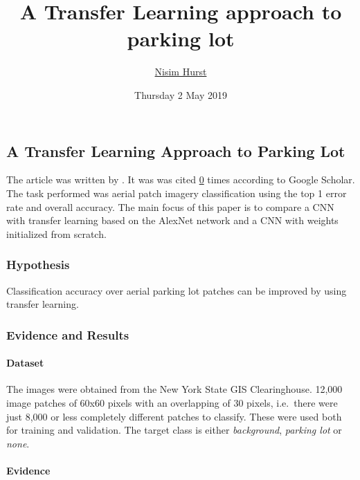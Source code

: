 \documentclass[]{article}
\title{A Transfer Learning approach to parking lot}
\author{\href{mailto:langheran@gmail.com}{Nisim Hurst}}
\date{Thursday 2 May 2019}
\let\oldparagraph\paragraph
\renewcommand{\paragraph}[1]{\oldparagraph{#1}\mbox{}}
\begin{document}
\maketitle

\label{toc}

\hypertarget{a-transfer-learning-approach-to-parking-lot}{%
\subsection{A Transfer Learning Approach to Parking Lot}\label{a-transfer-learning-approach-to-parking-lot}}

The article was written by \autocite{8085049}. It was was cited \href{https://scholar.google.com/scholar?hl=en\&as_sdt=0\%2C5\&as_vis=1\&q=A+Transfer+Learning+approach+to+parking+lot+Cisek\&btnG=}{0} times according to Google Scholar. The task performed was aerial patch imagery classification using the top 1 error rate and overall accuracy. The main focus of this paper is to compare a CNN with transfer learning based on the AlexNet network and a CNN with weights initialized from scratch.

\hypertarget{hypothesis}{%
\subsubsection{Hypothesis}\label{hypothesis}}

Classification accuracy over aerial parking lot patches can be improved by using transfer learning.

\hypertarget{evidence-and-results}{%
\subsubsection{Evidence and Results}\label{evidence-and-results}}

\hypertarget{dataset}{%
\paragraph{Dataset}\label{dataset}}

The images were obtained from the New York State GIS Clearinghouse. 12,000 image patches of 60x60 pixels with an overlapping of 30 pixels, i.e.~there were just 8,000 or less completely different patches to classify. These were used both for training and validation. The target class is either \emph{background}, \emph{parking lot} or \emph{none}.

\hypertarget{evidence}{%
\paragraph{Evidence}\label{evidence}}
\end{document}
